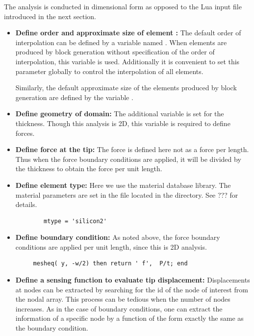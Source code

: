 \clearpage
The analysis is conducted in dimensional form as opposed to the
Lua input file introduced in the next section.

\begin{itemize}

  \item{\textbf{Define order and approximate size of element :}}
  The default order of interpolation can be defined by a variable named
  . When elements are produced by block generation without
  specification of the order of interpolation, this variable is used.
  Additionally it is convenient to set this parameter globally to
  control the interpolation of all elements.

  Similarly, the default approximate size of the elements produced by
  block generation are defined by the variable . 

  \item{\textbf{Define geometry of domain:}}
  The additional variable  is set for the thickness.
  Though this analysis is 2D, this variable is required to 
  define forces.

  \item{\textbf{Define force at the tip:}}
  The force is defined here not as a force per length. Thus
  when the force boundary conditions are applied, it will be
  divided by the thickness to obtain the force per unit length.  

  \item{\textbf{Define element type:}}
  Here we use the material database library. The material 
  parameters are set in the file  located
  in the  directory. See ??? for details.

\begin{verbatim}
        mtype = 'silicon2'
\end{verbatim}

  \item{\textbf{Define boundary condition:}}
  As noted above, the force boundary conditions are applied per
  unit length, since this is 2D analysis.

\begin{verbatim}
     mesheq( y, -w/2) then return ' f',  P/t; end
\end{verbatim}

  \item{\textbf{Define a sensing function to evaluate tip displacement:}}
  Displacements at nodes can be extracted by searching for the id of the
  node of interest from the nodal array. This process can be tedious when
  the number of nodes increases. As in the case of boundary conditions,
  one can extract the information of a specific node by a function of
  the form exactly the same as the boundary condition.


\end{itemize}
